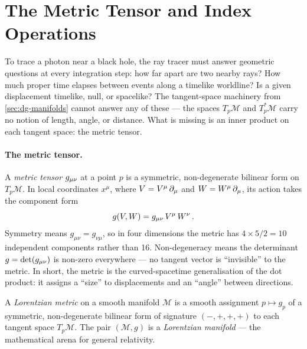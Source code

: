\section{The Metric Tensor and Index Operations}
\label{sec:dg-metric}

To trace a photon near a black hole, the ray tracer must answer geometric
questions at every integration step: how far apart are two nearby rays?  How
much proper time elapses between events along a timelike worldline?  Is a
given displacement timelike, null, or spacelike?  The tangent-space machinery
from \cref{sec:dg-manifolds} cannot answer any of these --- the spaces
$T_p\mathcal{M}$ and $T^*_p\mathcal{M}$ carry no notion of length, angle,
or distance.  What is missing is an inner product on each tangent space: the
metric tensor.

\paragraph{The metric tensor.}

A \emph{metric tensor} $g_{\mu\nu}$ at a point $p$ is a symmetric,
non-degenerate bilinear form on $T_p\mathcal{M}$.  In local coordinates
$x^\mu$, where $V = V^\mu\,\partial_{\mu}$ and $W = W^\mu\,\partial_{\mu}$, its action
takes the component form
%
\begin{equation}
  g(V, W) = g_{\mu\nu}\, V^\mu\, W^\nu \,.
  \label{eq:metric-bilinear}
\end{equation}
%
Symmetry means $g_{\mu\nu} = g_{\nu\mu}$, so in four dimensions the metric has
$4 \times 5 / 2 = 10$ independent components rather than 16.  Non-degeneracy
means the determinant $g = \det(g_{\mu\nu})$ is non-zero everywhere --- no
tangent vector is ``invisible'' to the metric.  In short, the metric is the
curved-spacetime generalisation of the dot product: it assigns a ``size'' to
displacements and an ``angle'' between directions.

\begin{definition}
\label{def:metric-tensor}
A \emph{Lorentzian metric} on a smooth manifold $\mathcal{M}$ is a smooth
assignment $p \mapsto g_p$ of a symmetric, non-degenerate bilinear form of
signature $(-,+,+,+)$ to each tangent space $T_p\mathcal{M}$.  The pair
$(\mathcal{M}, g)$ is a \emph{Lorentzian manifold} --- the mathematical arena
for general relativity.
\end{definition}


